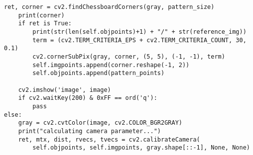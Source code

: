 \begin{lstlisting}[caption=calibration code,label=calib_code]
    ret, corner = cv2.findChessboardCorners(gray, pattern_size)                                                                                          
    print(corner)                                                                                                                                        
    if ret is True:                                                                                                                                      
        print(str(len(self.objpoints)+1) + "/" + str(reference_img))                                                                                     
        term = (cv2.TERM_CRITERIA_EPS + cv2.TERM_CRITERIA_COUNT, 30, 0.1)                                                                                
        cv2.cornerSubPix(gray, corner, (5, 5), (-1, -1), term)                                                                                           
        self.imgpoints.append(corner.reshape(-1, 2))                                                                                                     
        self.objpoints.append(pattern_points)                                                                                                            
                                                                                                                                                         
    cv2.imshow('image', image)                                                                                                                           
    if cv2.waitKey(200) & 0xFF == ord('q'):                                                                                                              
        pass                                                                                                                                             
else:                                                                                                                                                    
    gray = cv2.cvtColor(image, cv2.COLOR_BGR2GRAY)                                                                                                       
    print("calculating camera parameter...")                                                                                                             
    ret, mtx, dist, rvecs, tvecs = cv2.calibrateCamera(                                                                                                  
        self.objpoints, self.imgpoints, gray.shape[::-1], None, None)                                                                                    
                                                                                                                                                         

\end{lstlisting}
